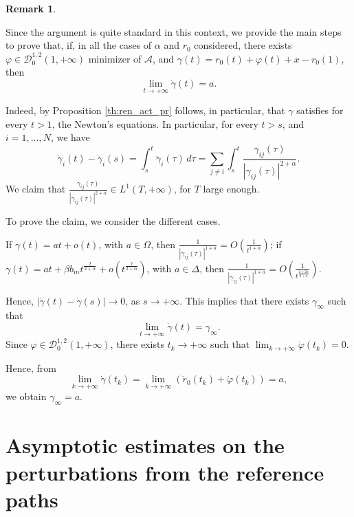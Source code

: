 \documentclass[a4paper,10pt]{amsart}
\theoremstyle{plain}
\theoremstyle{definition}
\newtheorem{rem}[thm]{Remark}
\numberwithin{equation}{section}
\numberwithin{thm}{section}
\begin{document}
\begin{rem} 
\label{rem:dot_gamma_a}
    {
    \rm
    Since the argument is quite standard in this context, we provide the main steps to prove that, if, in all the cases of $\alpha$ and $r_0$ considered, there exists $\varphi \in \mathcal{D}^{1,2}_0(1,+\infty)$ minimizer of $\mathcal A$, and $\gamma(t)=r_0(t)+\varphi(t)+x-r_0(1)$, then 
    \[
    \lim_{t\rightarrow+\infty}\dot \gamma(t) = a.
    \]

    Indeed, by Proposition \ref{th:ren_act_pr} follows, in particular, that $\gamma$ satisfies for every $t>1$, the Newton's equations. In particular, for every $t>s$, and $i=1,\dots,N$, we have
    \[
    \dot \gamma_i(t)-\dot \gamma_i(s) =\int_{s}^{t} \ddot \gamma_i(\tau)\,d\tau = \sum_{j\neq i} \int_{s}^{t} \frac{\gamma_{ij}(\tau)}{|\gamma_{ij}(\tau)|^{2+\alpha}}.
    \]
    We claim that $\frac{\gamma_{ij}(\tau)}{|\gamma_{ij}(\tau)|^{2+\alpha}} \in L^1(T,+\infty)$, for $T$ large enough.

    To prove the claim, we consider the different cases. 

    If $\gamma(t)=at + o(t)$, with $a \in \Omega$, then  $\frac{1}{|\gamma_{ij}(\tau)|^{1+\alpha}} = O\left(\frac{1}{t^{1+\alpha}}\right) $; if $\gamma(t)=at+\beta b_m t^\frac{2}{2+\alpha}+o(t^\frac{2}{2+\alpha})$, with $a \in \Delta$, then $\frac{1}{|\gamma_{ij}(\tau)|^{1+\alpha}} = O\left(\frac1{t^\frac{2+2\alpha}{2+\alpha}}\right)$.

    Hence, $|\dot \gamma(t)-\dot \gamma(s)|\to 0$, as $s \rightarrow+\infty$. This implies that there exists $\gamma_\infty$ such that 
    \[
    \lim_{t \rightarrow+\infty}\dot\gamma(t) = \gamma_\infty.
    \]
    Since $\varphi \in \mathcal{D}_0^{1,2}(1,+\infty)$, there exists $t_k \rightarrow+\infty$ such that $\lim_{k \rightarrow+\infty} \dot \varphi(t_k)=0$.
    
    Hence, from
    \[
    \lim_{k\rightarrow+\infty}\dot\gamma(t_k)=\lim_{k\rightarrow+\infty}\left(\dot r_0(t_k) + \dot\varphi(t_k)\right)=a,
    \]
    we obtain $\gamma_\infty=a$.
    
    }
\end{rem}














\section{Asymptotic estimates on the perturbations from the reference paths}\label{sec:asymptotic_estimates}
\end{document}
